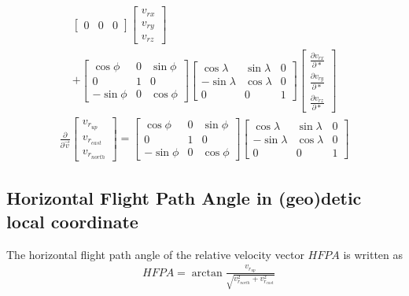 \documentclass[11pt]{article}
\begin{document}
\begin{equation}
\begin{aligned}
\begin{bmatrix}
		0 & 0 & 0
		\end{bmatrix}
		\begin{bmatrix}
		v_{rx}\\
		v_{ry}\\
		v_{rz}
		\end{bmatrix} \\
		+
		\begin{bmatrix}
		\cos{\phi} & 0 & \sin{\phi}\\
		0 & 1 & 0\\
		-\sin{\phi} & 0 & \cos{\phi}
		\end{bmatrix}
		\begin{bmatrix}
		\cos{\lambda} & \sin{\lambda} & 0\\
		-\sin{\lambda}& \cos{\lambda} & 0\\
		0 & 0 & 1
		\end{bmatrix}
		\begin{bmatrix}
		\frac{\partial v_{rx}}{\partial *}\\
		\frac{\partial v_{ry}}{\partial *}\\
		\frac{\partial v_{rz}}{\partial *}
		\end{bmatrix}
	\end{aligned}
\end{equation}
\begin{equation}
	\begin{aligned}
	\frac{\partial}{\partial \vec{v}}
		\begin{bmatrix}
		v_{r_{up}}\\
		v_{r_{east}}\\
		v_{r_{north}}
		\end{bmatrix} =
		\begin{bmatrix}
		\cos{\phi} & 0 & \sin{\phi}\\
		0 & 1 & 0\\
		-\sin{\phi} & 0 & \cos{\phi}
		\end{bmatrix}
		\begin{bmatrix}
		\cos{\lambda} & \sin{\lambda} & 0\\
		-\sin{\lambda}& \cos{\lambda} & 0\\
		0 & 0 & 1
		\end{bmatrix}
	\end{aligned}
\end{equation}

\subsection{Horizontal Flight Path Angle in (geo)detic local coordinate}
The horizontal flight path angle of the relative velocity vector $HFPA$ is written as
\begin{equation}
	\label{eq:rel_velocity_HFPA}
	\begin{aligned}
		&HFPA = \arctan{\frac{v_{r_{up}}}{\sqrt{v_{r_{north}}^2 + v_{r_{east}}^2}}}
	\end{aligned}
\end{equation}
\end{document}
